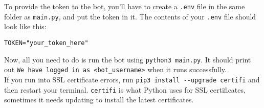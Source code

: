 \documentclass{article}
\begin{document}
To provide the token to the bot, you'll have to create a \verb|.env| file in the same folder as \verb|main.py|, and put the token in it. The contents of your \verb|.env| file should look like this: 

\begin{verbatim}
TOKEN="your_token_here"
\end{verbatim}

Now, all you need to do is run the bot using \verb|python3 main.py|. It should print out \verb|We have logged in as <bot_username>| when it runs successfully.\\

If you run into SSL certificate errors, run \verb|pip3 install --upgrade certifi| and then restart your terminal. \verb|certifi| is what Python uses for SSL certificates, sometimes it needs updating to install the latest certificates. \\

\end{document}
